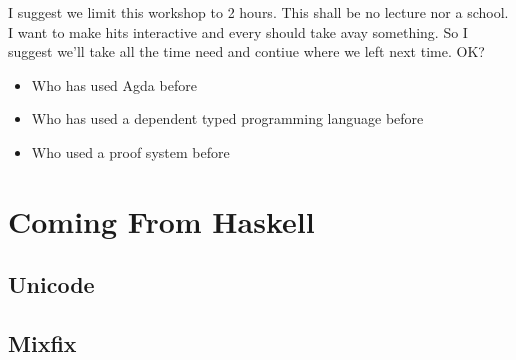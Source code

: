 \documentclass[12pt]{article}
\begin{document}
\tableofcontents{}

I suggest we limit this workshop to 2 hours. This shall be no lecture nor a school.
I want to make hits interactive and every should take avay something. So I suggest
we'll take all the time need and contiue where we left next time. OK?

\begin{itemize}
\item Who has used Agda before
\item Who has used a dependent typed programming language before
  \item Who used a proof system before
\end{itemize}





\section{Coming From Haskell}
\subsection{Unicode}

\subsection{Mixfix}

\printbibliography{}
\end{document}
